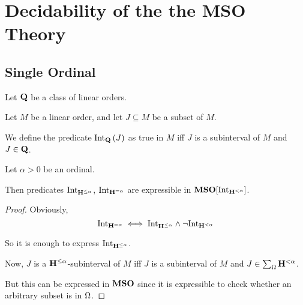 \section{Decidability of the the MSO Theory}

\subsection{Single Ordinal}

\begin{definition}
  Let $\mathbf{Q}$ be a class of linear orders.

  Let $M$ be a linear order, and let $J \subseteq M$ be a subset of $M$.

  We define the predicate $\mathrm{Int}_{\mathbf{Q}} \left( {J} \right)$ as
  true in $M$ iff $J$ is a subinterval of $M$ and
  $J \in \mathbf{Q}$.
\end{definition}

\begin{lemma}
  Let $\alpha > 0$ be an ordinal.

  Then predicates $\mathrm{Int}_{\mathbf{H}^{\le \alpha}}$, $\mathrm{Int}_{\mathbf{H}^{= \alpha}}$
  are expressible in $\mathbf{MSO}[\mathrm{Int}_{\mathbf{H}^{< \alpha}}]$.
\end{lemma}

\begin{proof}
  Obviously, \[
    \mathrm{Int}_{\mathbf{H}^{= \alpha}}
    \iff \mathrm{Int}_{\mathbf{H}^{\le \alpha}} \wedge \neg \mathrm{Int}_{\mathbf{H}^{< \alpha}}
  \]

  So it is enough to express $\mathrm{Int}_{\mathbf{H}^{\le \alpha}}$.

  Now, $J$ is a $\mathbf{H}^{\le \alpha}$-subinterval of $M$ iff
  $J$ is a subinterval of $M$ and $J \in \sum_{\Omega}{\mathbf{H}^{< \alpha}}$.

  But this can be expressed in $\mathbf{MSO}$ since it is expressible
  to check whether an arbitrary subset is in $\Omega$.
\end{proof}

